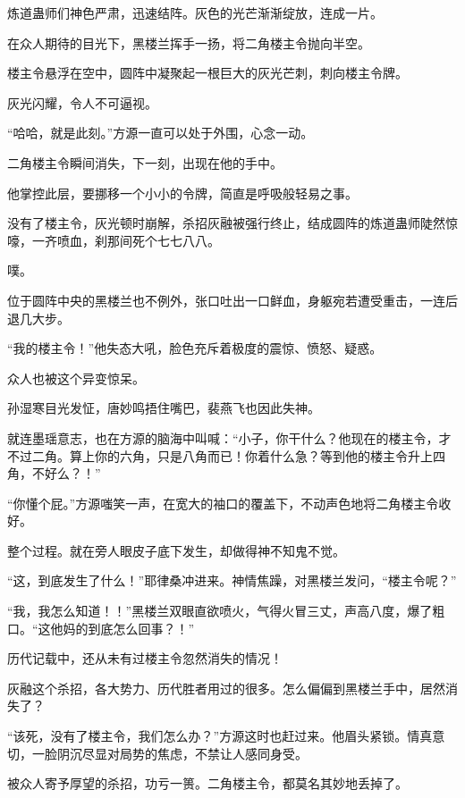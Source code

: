 
\begin{this_body}



炼道蛊师们神色严肃，迅速结阵。灰色的光芒渐渐绽放，连成一片。

在众人期待的目光下，黑楼兰挥手一扬，将二角楼主令抛向半空。

楼主令悬浮在空中，圆阵中凝聚起一根巨大的灰光芒刺，刺向楼主令牌。

灰光闪耀，令人不可逼视。

“哈哈，就是此刻。”方源一直可以处于外围，心念一动。

二角楼主令瞬间消失，下一刻，出现在他的手中。

他掌控此层，要挪移一个小小的令牌，简直是呼吸般轻易之事。

没有了楼主令，灰光顿时崩解，杀招灰融被强行终止，结成圆阵的炼道蛊师陡然惊嚎，一齐喷血，刹那间死个七七八八。

噗。

位于圆阵中央的黑楼兰也不例外，张口吐出一口鲜血，身躯宛若遭受重击，一连后退几大步。

“我的楼主令！”他失态大吼，脸色充斥着极度的震惊、愤怒、疑惑。

众人也被这个异变惊呆。

孙湿寒目光发怔，唐妙鸣捂住嘴巴，裴燕飞也因此失神。

就连墨瑶意志，也在方源的脑海中叫喊：“小子，你干什么？他现在的楼主令，才不过二角。算上你的六角，只是八角而已！你着什么急？等到他的楼主令升上四角，不好么？！”

“你懂个屁。”方源嗤笑一声，在宽大的袖口的覆盖下，不动声色地将二角楼主令收好。

整个过程。就在旁人眼皮子底下发生，却做得神不知鬼不觉。

“这，到底发生了什么！”耶律桑冲进来。神情焦躁，对黑楼兰发问，“楼主令呢？”

“我，我怎么知道！！”黑楼兰双眼直欲喷火，气得火冒三丈，声高八度，爆了粗口。“这他妈的到底怎么回事？！”

历代记载中，还从未有过楼主令忽然消失的情况！

灰融这个杀招，各大势力、历代胜者用过的很多。怎么偏偏到黑楼兰手中，居然消失了？

“该死，没有了楼主令，我们怎么办？”方源这时也赶过来。他眉头紧锁。情真意切，一脸阴沉尽显对局势的焦虑，不禁让人感同身受。

被众人寄予厚望的杀招，功亏一篑。二角楼主令，都莫名其妙地丢掉了。


\end{this_body}
